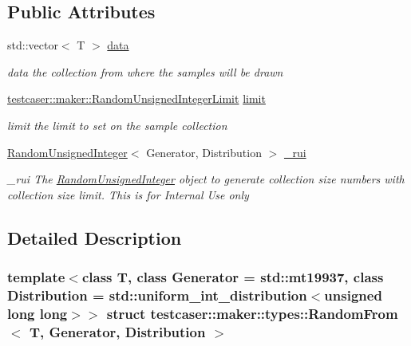 \subsection*{Public Attributes}
\begin{DoxyCompactItemize}
\item 
std\+::vector$<$ T $>$ \mbox{\hyperlink{structtestcaser_1_1maker_1_1types_1_1RandomFrom_a1f346e06890d0451607551dcb0e3a426}{data}}
\begin{DoxyCompactList}\small\item\em data the collection from where the samples will be drawn \end{DoxyCompactList}\item 
\mbox{\hyperlink{classtestcaser_1_1maker_1_1RandomUnsignedIntegerLimit}{testcaser\+::maker\+::\+Random\+Unsigned\+Integer\+Limit}} \mbox{\hyperlink{structtestcaser_1_1maker_1_1types_1_1RandomFrom_a4701553931d6eafed7f3070fa64924b7}{limit}}
\begin{DoxyCompactList}\small\item\em limit the limit to set on the sample collection \end{DoxyCompactList}\item 
\mbox{\hyperlink{classtestcaser_1_1maker_1_1types_1_1RandomUnsignedInteger}{Random\+Unsigned\+Integer}}$<$ Generator, Distribution $>$ \mbox{\hyperlink{structtestcaser_1_1maker_1_1types_1_1RandomFrom_abf3411be34374535dce67aeecabe0e8c}{\+\_\+rui}}
\begin{DoxyCompactList}\small\item\em \+\_\+rui The \mbox{\hyperlink{classtestcaser_1_1maker_1_1types_1_1RandomUnsignedInteger}{Random\+Unsigned\+Integer}} object to generate collection size numbers with collection size limit. This is for Internal Use only \end{DoxyCompactList}\end{DoxyCompactItemize}


\subsection{Detailed Description}
\subsubsection*{template$<$class T, class Generator = std\+::mt19937, class Distribution = std\+::uniform\+\_\+int\+\_\+distribution$<$unsigned long long$>$$>$\newline
struct testcaser\+::maker\+::types\+::\+Random\+From$<$ T, Generator, Distribution $>$}

